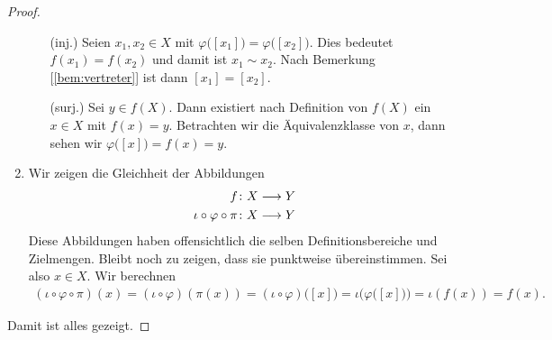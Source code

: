 \begin{satz}
\begin{proof}
\begin{enumerate}
\begin{itemize}
        \item[\tiny{(inj.)}] Seien $x_{1},x_{2}\in X$ mit
          $\varphi\big([x_{1}]\big) = \varphi\big([x_{2}]\big)$. Dies bedeutet
          $f(x_{1}) = f(x_{2})$ und damit ist $x_{1}\sim x_{2}$. Nach
          Bemerkung [\ref{bem:vertreter}] ist dann $[x_{1}] = [x_{2}]$.
        
        \item[\tiny{(surj.)}] Sei $y\in f(X)$. Dann existiert nach
          Definition von $f(X)$ ein $x\in X$ mit $f(x) = y$. Betrachten wir
          die Äquivalenzklasse von $x$, dann sehen wir
          $\varphi\big([x]\big) = f(x) = y$.

      \end{itemize}

    \item Wir zeigen die Gleichheit der Abbildungen
      \begin{align*}
        f &\colon X \longrightarrow Y \\
        \iota\circ\varphi\circ\pi &\colon X \longrightarrow Y
      \end{align*}
      Diese Abbildungen haben offensichtlich die selben Definitionsbereiche
      und Zielmengen. Bleibt noch zu zeigen, dass sie punktweise
      übereinstimmen. Sei also $x\in X$. Wir berechnen
      \begin{align*}
        (\iota\circ\varphi\circ\pi)(x) = (\iota\circ\varphi)(\pi(x)) =
        (\iota\circ\varphi)\big([x]\big) = \iota\Big(\varphi\big([x]\big)\Big) =
        \iota(f(x)) = f(x).
      \end{align*}
    \end{enumerate}
    Damit ist alles gezeigt.
    
  \end{proof}

\end{satz}


